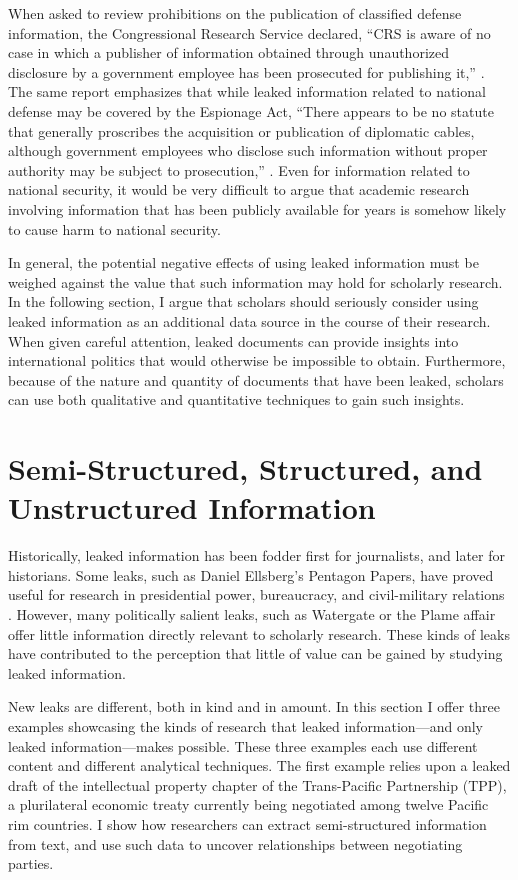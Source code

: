 \documentclass[12pt]{article}
\begin{document}
When asked to review prohibitions on 
the publication of classified defense information, the Congressional Research Service 
declared, ``CRS is aware of no case in which a publisher of information obtained through unauthorized disclosure by a government
employee has been prosecuted for publishing it,'' \citep[16]{elsea2013criminal}.
The same report emphasizes that while leaked information related to national defense may be covered by the Espionage Act, 
``There appears to be no statute that generally proscribes the acquisition or publication of diplomatic cables, although
government employees who disclose such information without proper authority may be subject to prosecution,'' \citep[14]{elsea2013criminal}.
Even for information related to national security, it would be very difficult to argue that academic research involving information 
that has been publicly available for years is somehow likely to cause harm to national security.

In general, the potential negative effects of using leaked information must be weighed against the value that such 
information may hold for scholarly research. In the following section, I argue that scholars should 
seriously 
consider using leaked information as an additional data source in the course of their research. 
When given careful attention, leaked documents can provide insights into international politics that 
would otherwise be impossible to obtain. Furthermore, because of the nature and quantity of documents 
that have been leaked, scholars can use both qualitative and quantitative techniques to gain such 
insights.

\section{Semi-Structured, Structured, and Unstructured Information}

Historically, leaked information has been fodder first for journalists, and later for historians. 
Some leaks, such as Daniel Ellsberg's Pentagon Papers, have proved useful for research in 
presidential power, bureaucracy, and civil-military relations \citep{schwab2006clash,stevenson2006warriors}. However, many politically salient 
leaks, such as Watergate or the Plame affair offer little information directly relevant to scholarly research. 
These kinds of leaks have contributed to the perception that little of value can be gained by studying leaked information. 

New leaks are different, both in kind and in amount. In this section I offer three examples showcasing the kinds of research that 
leaked information---and only leaked information---makes possible. These three examples each use different content and different 
analytical techniques. The first example relies upon a leaked draft of the intellectual property 
chapter of the Trans-Pacific 
Partnership (TPP), a plurilateral economic treaty currently being negotiated among twelve Pacific rim 
countries. I show how researchers can extract semi-structured information from text, and use such data 
to uncover relationships between negotiating parties.
\end{document}
